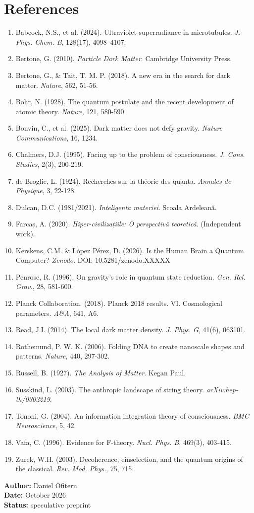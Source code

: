 \section*{References}
\begin{enumerate}
    \item Babcock, N.S., et al. (2024). Ultraviolet superradiance in microtubules. \textit{J. Phys. Chem. B}, 128(17), 4098--4107.
    \item Bertone, G. (2010). \textit{Particle Dark Matter}. Cambridge University Press.
    \item Bertone, G., \& Tait, T. M. P. (2018). A new era in the search for dark matter. \textit{Nature}, 562, 51-56.
    \item Bohr, N. (1928). The quantum postulate and the recent development of atomic theory. \textit{Nature}, 121, 580-590.
    \item Bonvin, C., et al. (2025). Dark matter does not defy gravity. \textit{Nature Communications}, 16, 1234.
    \item Chalmers, D.J. (1995). Facing up to the problem of consciousness. \textit{J. Cons. Studies}, 2(3), 200-219.
    \item de Broglie, L. (1924). Recherches sur la théorie des quanta. \textit{Annales de Physique}, 3, 22-128.
    \item Dulcan, D.C. (1981/2021). \textit{Inteligenta materiei}. Scoala Ardeleană.
    \item Farcaș, A. (2020). \textit{Hiper-civilizațiile: O perspectivă teoretică}. (Independent work).
    \item Kerskens, C.M. \& López Pérez, D. (2026). Is the Human Brain a Quantum Computer? \textit{Zenodo}. DOI: 10.5281/zenodo.XXXXX
    \item Penrose, R. (1996). On gravity's role in quantum state reduction. \textit{Gen. Rel. Grav.}, 28, 581-600.
    \item Planck Collaboration. (2018). Planck 2018 results. VI. Cosmological parameters. \textit{A\&A}, 641, A6.
    \item Read, J.I. (2014). The local dark matter density. \textit{J. Phys. G}, 41(6), 063101.
    \item Rothemund, P. W. K. (2006). Folding DNA to create nanoscale shapes and patterns. \textit{Nature}, 440, 297-302.
    \item Russell, B. (1927). \textit{The Analysis of Matter}. Kegan Paul.
    \item Susskind, L. (2003). The anthropic landscape of string theory. \textit{arXiv:hep-th/0302219}.
    \item Tononi, G. (2004). An information integration theory of consciousness. \textit{BMC Neuroscience}, 5, 42.
    \item Vafa, C. (1996). Evidence for F-theory. \textit{Nucl. Phys. B}, 469(3), 403-415.
    \item Zurek, W.H. (2003). Decoherence, einselection, and the quantum origins of the classical. \textit{Rev. Mod. Phys.}, 75, 715.
\end{enumerate}

\vspace{1cm}
\begin{flushright}
\textbf{Author:} Daniel Ofiteru \\
\textbf{Date:} October 2026 \\
\textbf{Status:} speculative preprint
\end{flushright}


